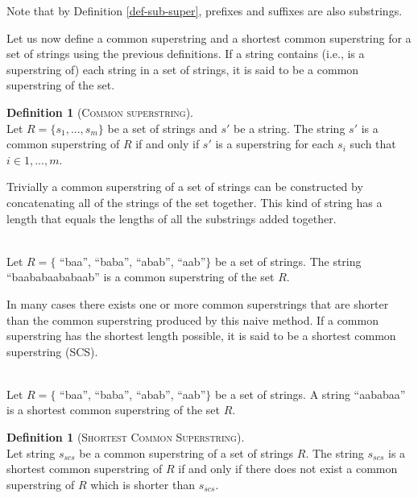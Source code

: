 \documentclass[english,twoside,censored,csm,algorithms-track-2020]{HYthesisML}
\theoremstyle{plain}
\theoremstyle{definition}
\newtheorem{definition}[theorem]{Definition}
\begin{document}
Note that by Definition \ref{def-sub-super}, prefixes and suffixes are also substrings.

Let us now define a common superstring and a shortest common superstring for a set of strings
using the previous definitions.
If a string contains (i.e., is a superstring of) each string in a set of strings, it is said to be
a common superstring of the set.

\begin{definition}[\textsc{Common superstring}]~\label{def-cs}\\
  Let $R = \{s_1,...,s_m\}$ be a set of strings and $s'$ be a string.
  The string $s'$ is a common superstring of $R$ if and only if $s'$ is a superstring
  for each $s_i$ such that $i\in 1,...,m$.
\end{definition}

Trivially a common superstring of a set of strings can be constructed by concatenating all of
the strings of the set together.
This kind of string has a length that equals the lengths of all the substrings added together.

\begin{testexample}~\label{exml-cs}\\
  Let $R=\{$ ``baa'', ``baba'', ``abab'', ``aab''$\}$ be a set of strings.
  The string ``baababaababaab'' is a common superstring of the set $R$.
\end{testexample}

In many cases there exists one or more common superstrings that are shorter than the common
superstring produced by this naive method.
If a common superstring has the shortest length possible, it is said to be a shortest common superstring (SCS).

\begin{testexample}~\label{exml-scs}\\
  Let $R=\{$ ``baa'', ``baba'', ``abab'', ``aab''$\}$ be a set of strings.
  A string ``aababaa'' is a shortest common superstring of the set $R$.
\end{testexample}

\begin{definition}[\textsc{Shortest Common Superstring}]~\label{def-scs}\\
  Let string $s_{scs}$ be a common superstring of a set of strings $R$.
  The string $s_{scs}$ is a shortest common superstring of $R$ if and only if there does not exist
  a common superstring of $R$ which is shorter than $s_{scs}$.
\end{definition}
\end{document}
